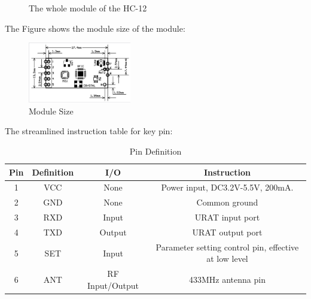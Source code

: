 \documentclass[12pt, a4paper, oneside]{report}
\begin{document}
\begin{figure}[H]
  \centering
  \hspace{0.5cm}
  \caption{The whole module of the HC-12}
  \label{fig:hc12-4-5}
\end{figure}
The Figure shows the module size of the module:
\begin{figure}[H]
  \centering
  \includegraphics[width=0.4\textwidth]{pic/HC12/hc12-6.png}
  \caption{Module Size}
  \label{fig:hc12-6}
\end{figure}

The streamlined instruction table for key pin: 
\begin{table}[H]
\caption{Pin Definition}
\begin{tabular}{|c|c|c|c|}
\hline
Pin & Definition & I/O & Instruction \\
\hline
1 & VCC & None & Power input, DC3.2V-5.5V, 200mA. \\
\hline
2 & GND & None & Common ground \\
\hline
3 & RXD & Input & URAT input port \\
\hline
4 & TXD & Output & URAT output port \\
\hline
5 & SET & Input & Parameter setting control pin,   effective at low level \\
\hline
6 & ANT & RF Input/Output & 433MHz antenna pin \\
\hline

\end{tabular}
\end{table}
\end{document}
